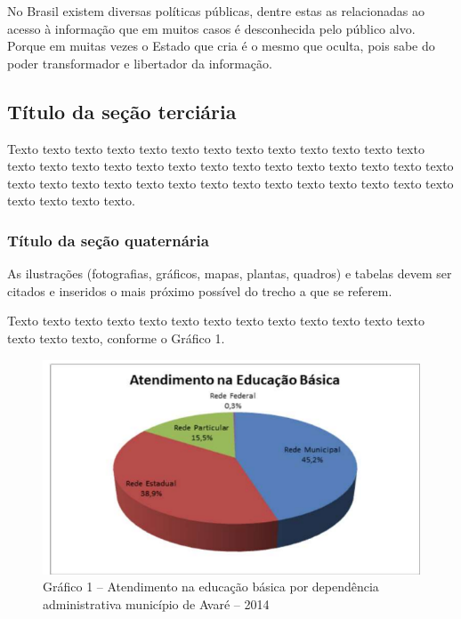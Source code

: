 No Brasil existem diversas políticas públicas, dentre estas as relacionadas ao 
acesso à informação que em muitos casos é desconhecida pelo público alvo. Porque 
em muitas vezes o Estado que cria é o mesmo que oculta, pois sabe do poder 
transformador e libertador da informação. 


\subsection{Título da seção terciária}

Texto texto texto texto texto texto texto texto texto texto texto texto texto texto 
texto texto texto texto texto texto texto texto texto texto texto texto texto texto texto 
texto texto texto texto texto texto texto texto texto texto texto texto texto texto texto 
texto. 

\subsubsection{Título da seção quaternária}

As ilustrações (fotografias, gráficos, mapas, plantas, quadros) e tabelas 
devem ser citados e inseridos o mais próximo possível do trecho a que se referem. 

Texto texto texto texto texto texto texto texto texto texto texto texto texto texto texto 
texto, conforme o Gráfico 1.

\begin{figure}[H]
\renewcommand{\figurename}{Gráfico}	
\caption*{ \label{graf1}Gráfico 1 – Atendimento na educação básica por dependência 
administrativa município de Avaré – 2014}
	\begin{center}
	    \includegraphics[scale=1.0]{imagens/grafs_1.png}
	\end{center}

\end{figure}



